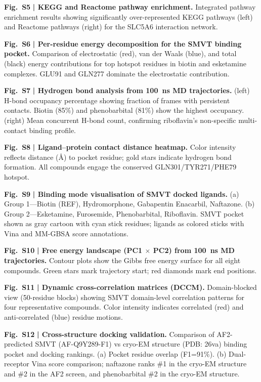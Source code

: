 \documentclass[10pt,letterpaper]{article}
\begin{document}
\noindent\textbf{Fig.~S5} \textbf{| KEGG and Reactome pathway enrichment.} Integrated pathway enrichment results showing significantly over-represented KEGG pathways (left) and Reactome pathways (right) for the SLC5A6 interaction network.

\noindent\textbf{Fig.~S6} \textbf{| Per-residue energy decomposition for the SMVT binding pocket.} Comparison of electrostatic (red), van der Waals (blue), and total (black) energy contributions for top hotspot residues in biotin and esketamine complexes. GLU91 and GLN277 dominate the electrostatic contribution.

\noindent\textbf{Fig.~S7} \textbf{| Hydrogen bond analysis from 100~ns MD trajectories.} (left) H-bond occupancy percentage showing fraction of frames with persistent contacts. Biotin (85\%) and phenobarbital (81\%) show the highest occupancy. (right) Mean concurrent H-bond count, confirming riboflavin's non-specific multi-contact binding profile.

\noindent\textbf{Fig.~S8} \textbf{| Ligand--protein contact distance heatmap.} Color intensity reflects distance (\AA{}) to pocket residue; gold stars indicate hydrogen bond formation. All compounds engage the conserved GLN301/TYR271/PHE79 hotspot.

\noindent\textbf{Fig.~S9} \textbf{| Binding mode visualisation of SMVT docked ligands.} (a) Group 1---Biotin (REF), Hydromorphone, Gabapentin Enacarbil, Naftazone. (b) Group 2---Esketamine, Furosemide, Phenobarbital, Riboflavin. SMVT pocket shown as gray cartoon with cyan stick residues; ligands as colored sticks with Vina and MM-GBSA score annotations.

\noindent\textbf{Fig.~S10} \textbf{| Free energy landscape (PC1 $\times$ PC2) from 100~ns MD trajectories.} Contour plots show the Gibbs free energy surface for all eight compounds. Green stars mark trajectory start; red diamonds mark end positions.

\noindent\textbf{Fig.~S11} \textbf{| Dynamic cross-correlation matrices (DCCM).} Domain-blocked view (50-residue blocks) showing SMVT domain-level correlation patterns for four representative compounds. Color intensity indicates correlated (red) and anti-correlated (blue) residue motions.

\noindent\textbf{Fig.~S12} \textbf{| Cross-structure docking validation.} Comparison of AF2-predicted SMVT (AF-Q9Y289-F1) vs cryo-EM structure (PDB: 26va) binding pocket and docking rankings. (a) Pocket residue overlap (F1=91\%). (b) Dual-receptor Vina score comparison; naftazone ranks \#1 in the cryo-EM structure and \#2 in the AF2 screen, and phenobarbital \#2 in the cryo-EM structure.
\end{document}
